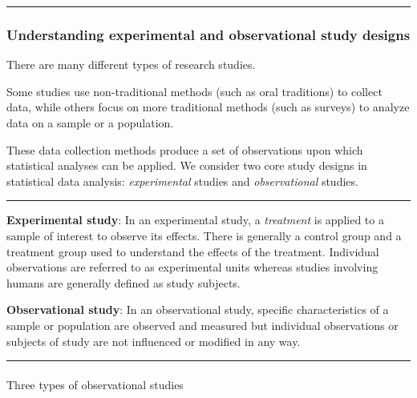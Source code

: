 \documentclass[
  letterpaper,
  DIV=11,
  numbers=noendperiod]{scrartcl}
\makeatletter
\let\oldparagraph\paragraph
\renewcommand{\paragraph}{
    \@ifstar
      \xxxParagraphStar
      \xxxParagraphNoStar
  }
\newcommand{\xxxParagraphStar}[1]{\oldparagraph*{#1}\mbox{}}
\newcommand{\xxxParagraphNoStar}[1]{\oldparagraph{#1}\mbox{}}
\makeatother
\begin{document}
\begin{center}\rule{0.5\linewidth}{0.5pt}\end{center}

\subsubsection{Understanding experimental and observational study
designs}\label{understanding-experimental-and-observational-study-designs}

There are many different types of research studies.

Some studies use non-traditional methods (such as oral traditions) to
collect data, while others focus on more traditional methods (such as
surveys) to analyze data on a sample or a population.

These data collection methods produce a set of observations upon which
statistical analyses can be applied. We consider two core study designs
in statistical data analysis: \emph{experimental} studies and
\emph{observational} studies.

\begin{center}\rule{0.5\linewidth}{0.5pt}\end{center}

\textbf{Experimental study}: In an experimental study, a
\emph{treatment} is applied to a sample of interest to observe its
effects. There is generally a control group and a treatment group used
to understand the effects of the treatment. Individual observations are
referred to as experimental units whereas studies involving humans are
generally defined as study subjects.

\textbf{Observational study}: In an observational study, specific
characteristics of a sample or population are observed and measured but
individual observations or subjects of study are not influenced or
modified in any way.

\begin{center}\rule{0.5\linewidth}{0.5pt}\end{center}

\paragraph{Three types of observational
studies}\label{three-types-of-observational-studies}
\end{document}
